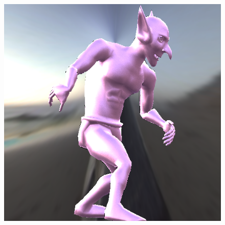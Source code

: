 \begin{figure}[H]
\endminipage\hfill
{}%
  \includegraphics[width=\linewidth]{./Imagens/brdfs/cook-torrance-alternative-goblin.png}
\endminipage
\end{figure}

